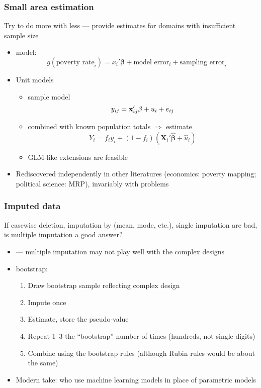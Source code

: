\documentclass[aspectratio=43]{beamer}
\begin{document}
\begin{frame}\frametitle{Small area estimation}

Try to do more with less --- provide estimates for domains with insufficient sample size

\begin{itemize}
    \item \citet{fay:herriot:1979} model:
        $$
            g(\mbox{poverty rate}_i) = x_i'\mathbf{\beta} + \mbox{model error}_i + \mbox{sampling error}_i
        $$
    \item Unit models \citep{rao:molina:2015}
    \begin{itemize}
        \item sample model
            $$
                y_{ij} = {\bf x}_{ij}' \mathbf{\beta} + u_i + e_{ij}
            $$
        \item combined with known population totals $\Rightarrow$ estimate
            $$
                \bar Y_i = f_i \bar y_i + (1-f_i) (\bar {\mathbf X}_i ' \hat{\mathbf{\beta}} + \hat u_i)
            $$
        \item GLM-like extensions are feasible
    \end{itemize}
    \item Rediscovered independently in other literatures (economics: poverty mapping; political science: MRP),
        invariably with problems \citep{molina:rao:2010}
\end{itemize}

\end{frame}

\begin{frame}\frametitle{Imputed data}

If casewise deletion, imputation by (mean, mode, etc.), single imputation
are bad, is multiple imputation \citep{rubin:1996,vanbuuren:2018} a good answer?

\begin{itemize}
    \item \citet{kim:brick:fuller:kalton:2006} --- multiple imputation may not play well with the complex designs
    \item \citet{shao:sitter:1996} bootstrap:
        \begin{enumerate}
            \item Draw bootstrap sample reflecting complex design
            \item Impute once
            \item Estimate, store the pseudo-value
            \item Repeat 1--3 the ``bootstrap'' number of times (hundreds, not single digits)
            \item Combine using the bootstrap rules (although Rubin rules would be about the same)
        \end{enumerate}
	\item Modern take: \citet{dagdoug:goga:haziza:2023} who use machine learning models
		in place of parametric models
\end{itemize}

\end{frame}
\end{document}
